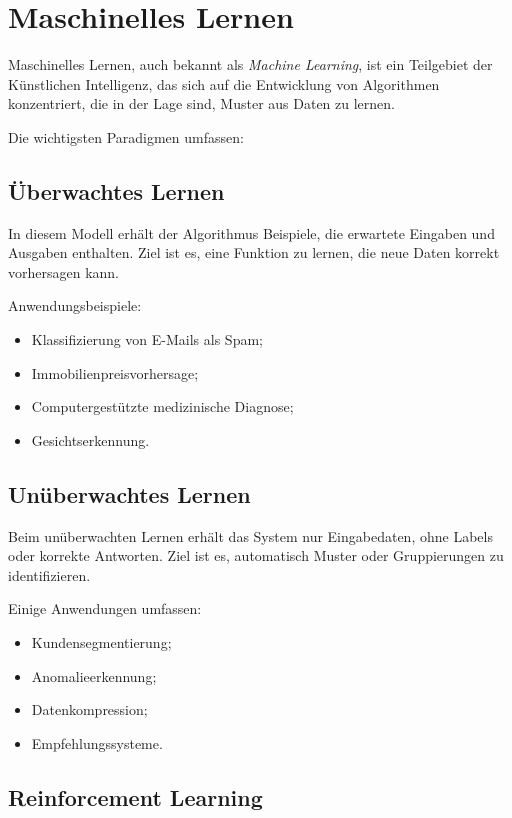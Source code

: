 \documentclass[11pt]{article}
\begin{document}
\section{Maschinelles Lernen}

Maschinelles Lernen, auch bekannt als \textit{Machine Learning}, ist ein Teilgebiet der
Künstlichen Intelligenz, das sich auf die Entwicklung von Algorithmen konzentriert, die in der Lage sind, Muster aus
Daten zu lernen.

Die wichtigsten Paradigmen umfassen: 

\subsection{Überwachtes Lernen}

In diesem Modell erhält der Algorithmus Beispiele, die erwartete Eingaben und Ausgaben enthalten. Ziel ist es,
eine Funktion zu lernen, die neue Daten korrekt vorhersagen kann.

Anwendungsbeispiele:

\begin{itemize}
    \item Klassifizierung von E-Mails als Spam;
    \item Immobilienpreisvorhersage;
    \item Computergestützte medizinische Diagnose;
    \item Gesichtserkennung.
\end{itemize}
 

\subsection{Unüberwachtes Lernen}

Beim unüberwachten Lernen erhält das System nur Eingabedaten, ohne Labels
oder korrekte Antworten. Ziel ist es, automatisch Muster oder Gruppierungen zu identifizieren.

Einige Anwendungen umfassen:

\begin{itemize}
    \item Kundensegmentierung;
    \item Anomalieerkennung;
    \item Datenkompression;
    \item Empfehlungssysteme.
\end{itemize} 

\subsection{Reinforcement Learning}
\end{document}
